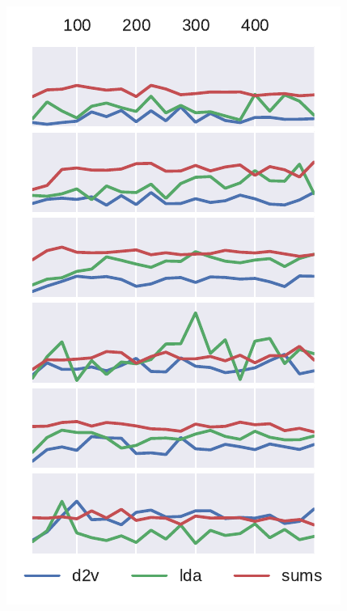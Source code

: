 \begin{figure}
\begin{minipage}[t]{0.265\textwidth}
        \includegraphics[width=\linewidth]{figures/mrr_graph}
        \vspace{-6.4mm}
        \label{fig:mrr}%
    \end{minipage}
\end{figure}

